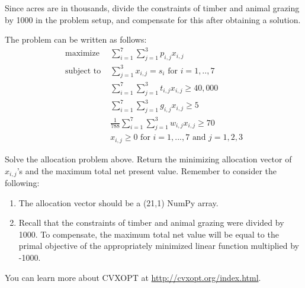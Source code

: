 Since acres are in thousands, divide the constraints of timber and animal grazing by 1000 in the problem setup, and compensate for this after obtaining a solution.

The problem can be written as follows:
\begin{align*}
\text{maximize } &\sum\limits_{i=1}^7 \sum\limits_{j=1}^3 p_{i,j}x_{i,j} \\
\text{subject to } &\sum\limits_{j=1}^3 x_{i,j} = s_i  \text{ for } i=1,..,7 \\
	        &\sum\limits_{i=1}^7 \sum\limits_{j=1}^3 t_{i,j}x_{i,j} \geq 40,000 \\
		&\sum\limits_{i=1}^7 \sum\limits_{j=1}^3 g_{i,j}x_{i,j} \geq 5 \\
		&\frac{1}{788} \sum\limits_{i=1}^7 \sum\limits_{j=1}^3 w_{i,j}x_{i,j} \geq 70 \\
		&x_{i,j} \geq 0 \text{ for } i=1,...,7  \text{ and } j=1,2,3
\end{align*}

\begin{problem}
Solve the allocation problem above.
Return the minimizing allocation vector of $x_{i,j}$'s and the maximum total net present value.
Remember to consider the following:
\begin{enumerate}
\item The allocation vector should be a (21,1) NumPy array.
\item Recall that the constraints of timber and animal grazing were divided by 1000.
To compensate, the maximum total net value will be equal to the primal objective of the appropriately minimized linear function multiplied by -1000.
\end{enumerate}
\end{problem}

You can learn more about CVXOPT at
\url{http://cvxopt.org/index.html}.
